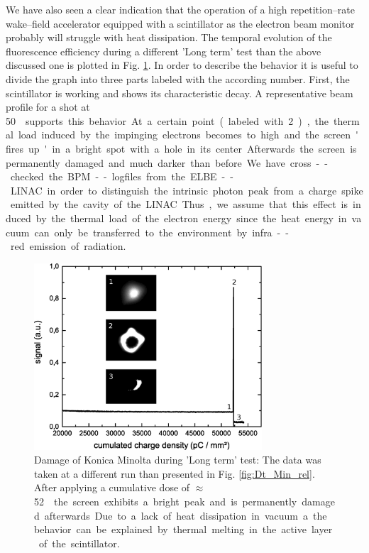 \documentclass[%
reprint,
amsmath,
amssymb,
aip,
rsi, 
numerical,
floatfix,
]{revtex4-1}
\begin{document}
We have also seen a clear indication that the operation of a high repetition--rate wake--field accelerator equipped with a scintillator as the electron beam monitor probably will struggle with heat dissipation.
The temporal evolution of the fluorescence efficiency during a different 'Long term' test than the above discussed one is plotted in Fig. \ref{fig:Damage}.
In order to describe the behavior it is useful to divide the graph into three parts labeled with the according number. 
First, the scintillator is working and shows its characteristic decay. 
A representative beam profile for a shot at \SI[per-mode=symbol]{50}{\nano\coulomb \per \milli\meter\square}  supports this behavior.
At a certain point (labeled with 2), the thermal load induced by the impinging electrons becomes to high and the screen 'fires up' in a bright spot with a hole in its center.
Afterwards the screen is permanently damaged and much darker than before.
We have cross--checked the BPM--logfiles from the ELBE--LINAC in order to distinguish the intrinsic photon peak from a charge spike emitted by the cavity of the LINAC.
Thus, we assume that this effect is induced by the thermal load of the electron energy since the heat energy in vacuum can only be transferred to the environment by infra--red emission of radiation.

\begin{figure}
\includegraphics[width=8.5cm]{./Figures/Damage}%
\caption{\label{fig:Damage} Damage of Konica Minolta during 'Long term' test: 
The data was taken at a different run than presented in Fig. \ref{fig:Dt_Min_rel}. 
After applying a cumulative dose of $\approx$ \SI[per-mode=symbol]{52}{\nano\coulomb \per \milli\meter\square} the screen exhibits a bright peak and is permanently damaged afterwards. 
Due to a lack of heat dissipation in vacuum a the behavior can be explained by thermal melting in the active layer of the scintillator.}
\end{figure}
\end{document}

